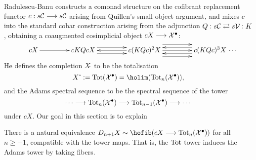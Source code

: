 \documentclass[11pt]{amsart}
\theoremstyle{plain}
\begin{document}
Radulescu-Banu constructs a comonad structure on the cofibrant replacement functor $c:s\mathcal{C}\longrightarrow s\mathcal{C}$ arising from Quillen's small object argument, and mixes $c$ into the standard cobar construction arising from the adjunction $Q:s\mathcal{C}\rightleftarrows s\mathcal{V}:K$, obtaining a coaugmented cosimplicial object $cX\longrightarrow\mathcal{X}^\bullet$:
\[
\vcenter{
\def\labelstyle{\scriptstyle}
\xymatrix@C=1.5cm@1{
cX\,
\ar[r]
&
\,cKQcX\,
\ar[r];[]
&
\,c(KQc)^2X\,
\ar@<-1ex>[l];[]
\ar@<+1ex>[l];[]
\ar@<+1ex>[r];[]
\ar@<-1ex>[r];[]
&
\,c(KQc)^3X\,\makebox[0cm][l]{\,$\cdots $}
\ar[l];[]
\ar@<-2ex>[l];[]
\ar@<+2ex>[l];[]
}}\]
He defines the completion $X\hat{\ }$ to be the totalisation
\[X\hat{\ }:=\textup{Tot}(\calX^\bullet)=\holim (\textup{Tot}_n(\calX^\bullet)),\]
and the Adams spectral sequence to be the spectral sequence of the tower
\[\cdots \longrightarrow\textup{Tot}_n(\mathcal{X}^\bullet)\longrightarrow \textup{Tot}_{n-1}(\mathcal{X}^\bullet)\longrightarrow\cdots \]
under $cX$. Our goal in this section is to explain
\begin{prop}\label{towerIdentification}
There is a natural equivalence  $D_{n+1}X\sim\hofib(cX\to\textup{Tot}_{n}(\calX^\bullet))$ for all $n\geq-1$, compatible with the tower maps. That is, the $\textup{Tot}$ tower induces the Adams tower by taking fibers.
\end{prop}
\end{document}
